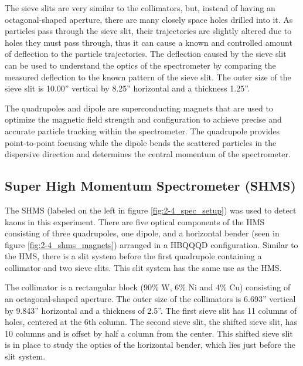 \documentclass[
]{report}
\begin{document}
The sieve slits are very similar to the collimators, but, instead of
having an octagonal-shaped aperture, there are many closely space holes
drilled into it. As particles pass through the sieve slit, their
trajectories are slightly altered due to holes they must pass through,
thus it can cause a known and controlled amount of deflection to the
particle trajectories. The deflection caused by the sieve slit can be
used to understand the optics of the spectrometer by comparing the
measured deflection to the known pattern of the sieve slit. The outer
size of the sieve slit is 10.00'' vertical by 8.25'' horizontal and a
thickness 1.25''.



The quadrupoles and dipole are superconducting magnets that are used to
optimize the magnetic field strength and configuration to achieve
precise and accurate particle tracking within the spectrometer. The
quadrupole provides point-to-point focusing while the dipole bends the
scattered particles in the dispersive direction and determines the
central momentum of the spectrometer.

\hypertarget{super-high-momentum-spectrometer-shms}{%
\subsection{Super High Momentum Spectrometer
(SHMS)}\label{super-high-momentum-spectrometer-shms}}

The SHMS (labeled on the left in figure \ref{fig:2-4_spec_setup}) was
used to detect kaons in this experiment. There are five optical
components of the HMS consisting of three quadrupoles, one dipole, and a
horizontal bender (seen in figure \ref{fig:2-4_shms_magnets}) arranged
in a HBQQQD configuration. Similar to the HMS, there is a slit system
before the first quadrupole containing a collimator and two sieve slits.
This slit system has the same use as the HMS.



The collimator is a rectangular block (90\% W, 6\% Ni and 4\% Cu)
consisting of an octagonal-shaped aperture. The outer size of the
collimators is 6.693'' vertical by 9.843'' horizontal and a thickness of
2.5''. The first sieve slit has 11 columns of holes, centered at the 6th
column. The second sieve slit, the shifted sieve slit, has 10 columns
and is offset by half a column from the center. This shifted sieve slit
is in place to study the optics of the horizontal bender, which lies
just before the slit system.
\end{document}

